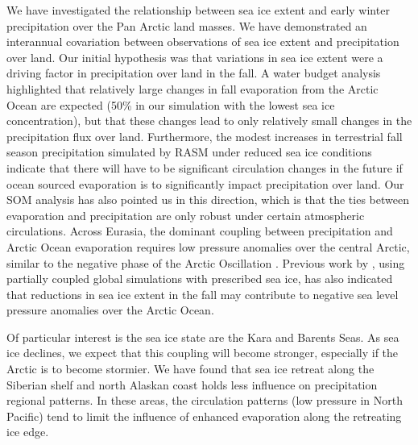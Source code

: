 We have investigated the relationship between sea ice extent and early winter precipitation over the Pan Arctic land masses.
We have demonstrated an interannual covariation between observations of sea ice extent and precipitation over land.
Our initial hypothesis was that variations in sea ice extent were a driving factor in precipitation over land in the fall.
A water budget analysis highlighted that relatively large changes in fall evaporation from the Arctic Ocean are expected (50\% in our simulation with the lowest sea ice concentration), but that these changes lead to only relatively small changes in the precipitation flux over land.
Furthermore, the modest increases in terrestrial fall season precipitation simulated by RASM under reduced sea ice conditions indicate that there will have to be significant circulation changes in the future if ocean sourced evaporation is  to significantly impact precipitation over land.
Our SOM analysis has also pointed us in this direction, which is that the ties between evaporation and precipitation are only robust under certain atmospheric circulations.
Across Eurasia, the dominant coupling between precipitation and Arctic Ocean evaporation requires low pressure anomalies over the central Arctic, similar to the negative phase of the Arctic Oscillation \citep{Thompson_1998}.
Previous work by \citet{Cassano_2014}, using partially coupled global simulations with prescribed sea ice, has also indicated that reductions in sea ice extent in the fall may contribute to negative sea level pressure anomalies over the Arctic Ocean.

Of particular interest is the sea ice state are the Kara and Barents Seas.
As sea ice declines, we expect that this coupling will become stronger, especially if the Arctic is to become stormier.
We have found that sea ice retreat along the Siberian shelf and north Alaskan coast  holds less influence on precipitation regional patterns.
In these areas, the circulation patterns (low pressure in North Pacific) tend to limit the influence of enhanced evaporation along the retreating ice edge.
